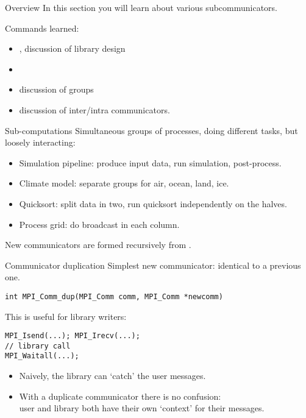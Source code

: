 
\begin{numberedframe}{Overview}
  In this section you will learn about various subcommunicators.

  Commands learned:
  \begin{itemize}
  \item {}, discussion of library design
  \item {}
  \item discussion of groups
  \item discussion of inter/intra communicators.
  \end{itemize}
\end{numberedframe}


\begin{numberedframe}{Sub-computations}
  Simultaneous groups of processes, doing different tasks, but
  loosely interacting:
  \begin{itemize}
  \item Simulation pipeline: produce input data, run simulation, post-process.
  \item Climate model: separate groups for air, ocean, land, ice.
  \item Quicksort: split data in two, run quicksort independently on the halves.
  \item Process grid: do broadcast in each column.
  \end{itemize}
  New communicators are formed recursively from .
\end{numberedframe}

\begin{numberedframe}{Communicator duplication}
Simplest new communicator: identical to a previous one.
\lstset{language=C++}
\begin{lstlisting}
int MPI_Comm_dup(MPI_Comm comm, MPI_Comm *newcomm)
\end{lstlisting}
This is useful for library writers:
\begin{lstlisting}
MPI_Isend(...); MPI_Irecv(...);
// library call
MPI_Waitall(...);  
\end{lstlisting}
\begin{itemize}
\item Naively, the library can `catch' the user messages.
\item With a duplicate communicator there is no confusion:\\
  user and library both have their own `context' for their messages.
\end{itemize}
\end{numberedframe}


